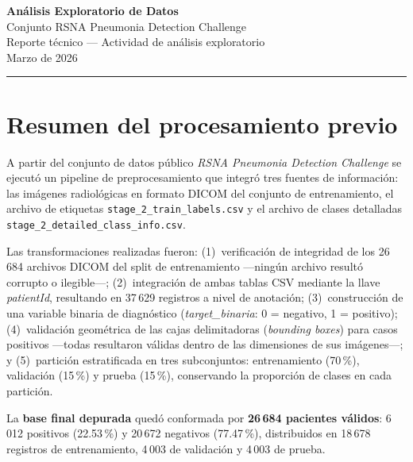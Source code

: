 \documentclass[11pt,spanish]{article}
\begin{document}
\begin{center}
  {\LARGE\bfseries Análisis Exploratorio de Datos}\\[4pt]
  {\large Conjunto RSNA Pneumonia Detection Challenge}\\[6pt]
  {\normalsize Reporte técnico --- Actividad de análisis exploratorio}\\[2pt]
  {\small Marzo de 2026}
\end{center}

\vspace{0.3cm}
\hrule
\vspace{0.4cm}

\section{Resumen del procesamiento previo}

A partir del conjunto de datos público \textit{RSNA Pneumonia Detection Challenge} se ejecutó
un pipeline de preprocesamiento que integró tres fuentes de información: las imágenes
radiológicas en formato DICOM del conjunto de entrenamiento, el archivo de etiquetas
\texttt{stage\_2\_train\_labels.csv} y el archivo de clases detalladas
\texttt{stage\_2\_detailed\_class\_info.csv}.

Las transformaciones realizadas fueron: (1)~verificación de integridad de los 26\,684 archivos
DICOM del split de entrenamiento —ningún archivo resultó corrupto o ilegible—;
(2)~integración de ambas tablas CSV mediante la llave \textit{patientId}, resultando en 37\,629
registros a nivel de anotación; (3)~construcción de una variable binaria de diagnóstico
(\textit{target\_binaria}: 0 = negativo, 1 = positivo); (4)~validación geométrica de las
cajas delimitadoras (\textit{bounding boxes}) para casos positivos —todas resultaron válidas
dentro de las dimensiones de sus imágenes—; y (5)~partición estratificada en tres subconjuntos:
entrenamiento (70\,\%), validación (15\,\%) y prueba (15\,\%), conservando la proporción
de clases en cada partición.

La \textbf{base final depurada} quedó conformada por \textbf{26\,684 pacientes válidos}:
6\,012 positivos (22.53\,\%) y 20\,672 negativos (77.47\,\%), distribuidos en 18\,678 registros
de entrenamiento, 4\,003 de validación y 4\,003 de prueba.
\end{document}
